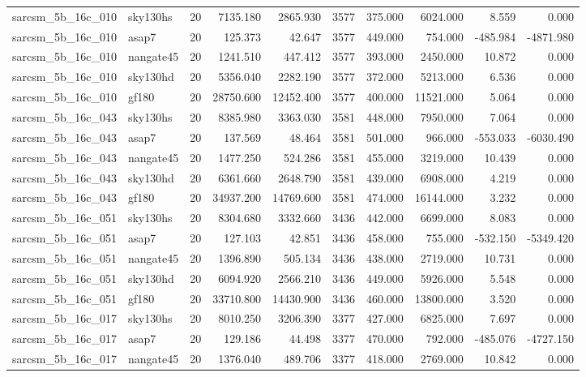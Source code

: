 \documentclass{article}
\begin{document}
\begin{longtable}{llrrrrrrrr}
sarcsm\_5b\_16c\_010 & sky130hs & 20 & 7135.180 & 2865.930 & 3577 & 375.000 & 6024.000 & 8.559 & 0.000 \\
sarcsm\_5b\_16c\_010 & asap7 & 20 & 125.373 & 42.647 & 3577 & 449.000 & 754.000 & -485.984 & -4871.980 \\
sarcsm\_5b\_16c\_010 & nangate45 & 20 & 1241.510 & 447.412 & 3577 & 393.000 & 2450.000 & 10.872 & 0.000 \\
sarcsm\_5b\_16c\_010 & sky130hd & 20 & 5356.040 & 2282.190 & 3577 & 372.000 & 5213.000 & 6.536 & 0.000 \\
sarcsm\_5b\_16c\_010 & gf180 & 20 & 28750.600 & 12452.400 & 3577 & 400.000 & 11521.000 & 5.064 & 0.000 \\
sarcsm\_5b\_16c\_043 & sky130hs & 20 & 8385.980 & 3363.030 & 3581 & 448.000 & 7950.000 & 7.064 & 0.000 \\
sarcsm\_5b\_16c\_043 & asap7 & 20 & 137.569 & 48.464 & 3581 & 501.000 & 966.000 & -553.033 & -6030.490 \\
sarcsm\_5b\_16c\_043 & nangate45 & 20 & 1477.250 & 524.286 & 3581 & 455.000 & 3219.000 & 10.439 & 0.000 \\
sarcsm\_5b\_16c\_043 & sky130hd & 20 & 6361.660 & 2648.790 & 3581 & 439.000 & 6908.000 & 4.219 & 0.000 \\
sarcsm\_5b\_16c\_043 & gf180 & 20 & 34937.200 & 14769.600 & 3581 & 474.000 & 16144.000 & 3.232 & 0.000 \\
sarcsm\_5b\_16c\_051 & sky130hs & 20 & 8304.680 & 3332.660 & 3436 & 442.000 & 6699.000 & 8.083 & 0.000 \\
sarcsm\_5b\_16c\_051 & asap7 & 20 & 127.103 & 42.851 & 3436 & 458.000 & 755.000 & -532.150 & -5349.420 \\
sarcsm\_5b\_16c\_051 & nangate45 & 20 & 1396.890 & 505.134 & 3436 & 438.000 & 2719.000 & 10.731 & 0.000 \\
sarcsm\_5b\_16c\_051 & sky130hd & 20 & 6094.920 & 2566.210 & 3436 & 449.000 & 5926.000 & 5.548 & 0.000 \\
sarcsm\_5b\_16c\_051 & gf180 & 20 & 33710.800 & 14430.900 & 3436 & 460.000 & 13800.000 & 3.520 & 0.000 \\
sarcsm\_5b\_16c\_017 & sky130hs & 20 & 8010.250 & 3206.390 & 3377 & 427.000 & 6825.000 & 7.697 & 0.000 \\
sarcsm\_5b\_16c\_017 & asap7 & 20 & 129.186 & 44.498 & 3377 & 470.000 & 792.000 & -485.076 & -4727.150 \\
sarcsm\_5b\_16c\_017 & nangate45 & 20 & 1376.040 & 489.706 & 3377 & 418.000 & 2769.000 & 10.842 & 0.000 \\

\end{longtable}
\end{document}
